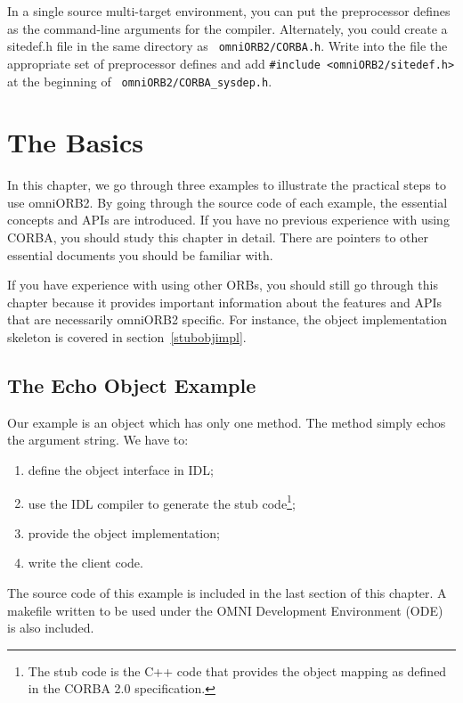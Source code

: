 \documentclass[11pt,twoside,onecolumn]{book}
\begin{document}
In a single source multi-target environment, you can put the preprocessor
defines as the command-line arguments for the compiler. Alternately, you could
create a sitedef.h file in the same directory as {\tt
omniORB2/CORBA.h}. Write into the file the appropriate set of preprocessor
defines and add {\tt \#include <omniORB2/sitedef.h>} at the beginning of {\tt
omniORB2/CORBA\_sysdep.h}.

%
\chapter{The Basics}
\label{ch_basic}

In this chapter, we go through three examples to illustrate the practical
steps to use omniORB2. By going through the source code of each example,
the essential concepts and APIs are introduced. If you have no previous
experience with using CORBA, you should study this chapter in detail. There
are pointers to other essential documents you should be familiar with.

If you have experience with using other ORBs, you should still go through
this chapter because it provides important information about the features
and APIs that are necessarily omniORB2 specific. For instance, the object
implementation skeleton is covered in section~\ref{stubobjimpl}.

\section{The Echo Object Example}

Our example is an object which has only one method. The method simply echos
the argument string. We have to:

\begin{enumerate}

\item define the object interface in IDL;
\item use the IDL compiler to generate the stub code\footnote{The stub code
is the C++ code that provides the object mapping as defined in the CORBA 2.0
specification.};
\item provide the object implementation;
\item write the client code.

\end{enumerate}

The source code of this example is included in the last section of this
chapter. A makefile written to be used under the OMNI Development
Environment (ODE)~\cite{tjr96b} is also included.
\end{document}
